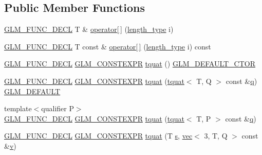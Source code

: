 \subsection*{Public Member Functions}
\begin{DoxyCompactItemize}
\item 
\hyperlink{setup_8hpp_ab2d052de21a70539923e9bcbf6e83a51}{G\+L\+M\+\_\+\+F\+U\+N\+C\+\_\+\+D\+E\+CL} T \& \hyperlink{structglm_1_1tquat_a0676fa7abe008f2912d296f6b3a569cf}{operator\mbox{[}$\,$\mbox{]}} (\hyperlink{structglm_1_1tquat_a6d9ab28781d7835b30216a996484c026}{length\+\_\+type} i)
\item 
\hyperlink{setup_8hpp_ab2d052de21a70539923e9bcbf6e83a51}{G\+L\+M\+\_\+\+F\+U\+N\+C\+\_\+\+D\+E\+CL} T const  \& \hyperlink{structglm_1_1tquat_a88fc5911dc554c71f5933d2fb99a7a7a}{operator\mbox{[}$\,$\mbox{]}} (\hyperlink{structglm_1_1tquat_a6d9ab28781d7835b30216a996484c026}{length\+\_\+type} i) const
\item 
\hyperlink{setup_8hpp_ab2d052de21a70539923e9bcbf6e83a51}{G\+L\+M\+\_\+\+F\+U\+N\+C\+\_\+\+D\+E\+CL} \hyperlink{setup_8hpp_a08b807947b47031d3a511f03f89645ad}{G\+L\+M\+\_\+\+C\+O\+N\+S\+T\+E\+X\+PR} \hyperlink{structglm_1_1tquat_a5ddc2ac5c094aa455d5dc896a1acf686}{tquat} () \hyperlink{setup_8hpp_afb97a4e995bc004c0cbbfa22125b80ba}{G\+L\+M\+\_\+\+D\+E\+F\+A\+U\+L\+T\+\_\+\+C\+T\+OR}
\item 
\hyperlink{setup_8hpp_ab2d052de21a70539923e9bcbf6e83a51}{G\+L\+M\+\_\+\+F\+U\+N\+C\+\_\+\+D\+E\+CL} \hyperlink{setup_8hpp_a08b807947b47031d3a511f03f89645ad}{G\+L\+M\+\_\+\+C\+O\+N\+S\+T\+E\+X\+PR} \hyperlink{structglm_1_1tquat_a2711d3970e6aeeade71debf8a9b5c012}{tquat} (\hyperlink{structglm_1_1tquat}{tquat}$<$ T, Q $>$ const \&\hyperlink{_s_d_l__opengl_8h_a8fc1e7b9baaae687804c7eed46ca09c6}{q}) \hyperlink{setup_8hpp_aefce7051c376a64ba89fa93a9f63bc2c}{G\+L\+M\+\_\+\+D\+E\+F\+A\+U\+LT}
\item 
{\footnotesize template$<$qualifier P$>$ }\\\hyperlink{setup_8hpp_ab2d052de21a70539923e9bcbf6e83a51}{G\+L\+M\+\_\+\+F\+U\+N\+C\+\_\+\+D\+E\+CL} \hyperlink{setup_8hpp_a08b807947b47031d3a511f03f89645ad}{G\+L\+M\+\_\+\+C\+O\+N\+S\+T\+E\+X\+PR} \hyperlink{structglm_1_1tquat_ac6d649e6c91a6bdcf324f870010a81bb}{tquat} (\hyperlink{structglm_1_1tquat}{tquat}$<$ T, P $>$ const \&\hyperlink{_s_d_l__opengl_8h_a8fc1e7b9baaae687804c7eed46ca09c6}{q})
\item 
\hyperlink{setup_8hpp_ab2d052de21a70539923e9bcbf6e83a51}{G\+L\+M\+\_\+\+F\+U\+N\+C\+\_\+\+D\+E\+CL} \hyperlink{setup_8hpp_a08b807947b47031d3a511f03f89645ad}{G\+L\+M\+\_\+\+C\+O\+N\+S\+T\+E\+X\+PR} \hyperlink{structglm_1_1tquat_a5abf4c68775ef307edb54e7e0bdf85ca}{tquat} (T \hyperlink{_s_d_l__opengl_8h_a4af680a6c683f88ed67b76f207f2e6e4}{s}, \hyperlink{structglm_1_1vec}{vec}$<$ 3, T, Q $>$ const \&\hyperlink{_s_d_l__opengl_8h_a10a82eabcb59d2fcd74acee063775f90}{v})

\end{DoxyCompactItemize}
